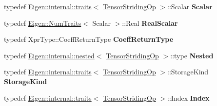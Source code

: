 \begin{DoxyCompactItemize}
typedef \hyperlink{struct_eigen_1_1internal_1_1traits}{Eigen\+::internal\+::traits}$<$ \hyperlink{class_eigen_1_1_tensor_striding_op}{Tensor\+Striding\+Op} $>$\+::Scalar {\bfseries Scalar}
\item 
\mbox{\label{class_eigen_1_1_tensor_striding_op_af1cfc253058507847f617fc701e04666}} 
typedef \hyperlink{group___core___module_struct_eigen_1_1_num_traits}{Eigen\+::\+Num\+Traits}$<$ Scalar $>$\+::Real {\bfseries Real\+Scalar}
\item 
\mbox{\label{class_eigen_1_1_tensor_striding_op_a1a28df70ed45e327cac1bd03226d8607}} 
typedef Xpr\+Type\+::\+Coeff\+Return\+Type {\bfseries Coeff\+Return\+Type}
\item 
\mbox{\label{class_eigen_1_1_tensor_striding_op_ab04153b430d9acdd41728afcdc0dd384}} 
typedef \hyperlink{struct_eigen_1_1internal_1_1nested}{Eigen\+::internal\+::nested}$<$ \hyperlink{class_eigen_1_1_tensor_striding_op}{Tensor\+Striding\+Op} $>$\+::type {\bfseries Nested}
\item 
\mbox{\label{class_eigen_1_1_tensor_striding_op_a4c11d2154aaa27c8deff74966ae254a1}} 
typedef \hyperlink{struct_eigen_1_1internal_1_1traits}{Eigen\+::internal\+::traits}$<$ \hyperlink{class_eigen_1_1_tensor_striding_op}{Tensor\+Striding\+Op} $>$\+::Storage\+Kind {\bfseries Storage\+Kind}
\item 
\mbox{\label{class_eigen_1_1_tensor_striding_op_a39ec4df37d2ca827a7cc11133eb9b007}} 
typedef \hyperlink{struct_eigen_1_1internal_1_1traits}{Eigen\+::internal\+::traits}$<$ \hyperlink{class_eigen_1_1_tensor_striding_op}{Tensor\+Striding\+Op} $>$\+::Index {\bfseries Index}
\end{DoxyCompactItemize}
